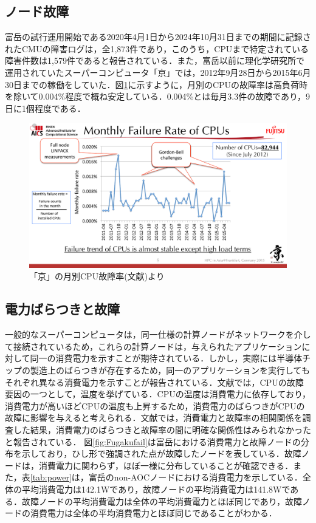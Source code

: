 \documentclass[a4paper,11pt,twocolumn]{jsarticle}
\begin{document}
\subsection{ノード故障}
富岳の試行運用開始である2020年4月1日から2024年10月31日までの期間に記録されたCMUの障害ログは，全1,873件であり，このうち，CPUまで特定されている障害件数は1,579件であると報告されている\cite{master_kusaba}．また，富岳以前に理化学研究所で運用されていたスーパーコンピュータ「京」では，2012年9月28日から2015年6月30日までの稼働をしていた．図\ref{fig:Kfail}に示すように，月別のCPUの故障率は高負荷時を除いて0.004\%程度で概ね安定している\cite{k_HPC}．0.004\%とは毎月3.3件の故障であり，9日に1個程度である．

\begin{figure}[t]
  \centering
  \includegraphics[width=0.8\linewidth]{figure/Kfail.pdf}
  \caption{「京」の月別CPU故障率(文献\cite{k_HPC})より}
  \label{fig:Kfail}
\end{figure}

\subsection{電力ばらつきと故障}
一般的なスーパーコンピュータは，同一仕様の計算ノードがネットワークを介して接続されているため，これらの計算ノードは，与えられたアプリケーションに対して同一の消費電力を示すことが期待されている．しかし，実際には半導体チップの製造上のばらつきが存在するため，同一のアプリケーションを実行してもそれぞれ異なる消費電力を示すことが報告されている．文献\cite{master_kusaba}では，CPUの故障要因の一つとして，温度を挙げている．CPUの温度は消費電力に依存しており，消費電力が高いほどCPUの温度も上昇するため，消費電力のばらつきがCPUの故障に影響を与えると考えられる．文献\cite{master_kusaba}では，消費電力と故障率の相関関係を調査した結果，消費電力のばらつきと故障率の間に明確な関係性はみられなかったと報告されている．
図\ref{fig:Fugakufail}は富岳における消費電力と故障ノードの分布を示しており，ひし形で強調された点が故障したノードを表している．故障ノードは，消費電力に関わらず，ほぼ一様に分布していることが確認できる．また，表\ref{tab:power}は，富岳のnon-AOCノードにおける消費電力を示している．全体の平均消費電力は142.1Wであり，故障ノードの平均消費電力は141.8Wである．故障ノードの平均消費電力は全体の平均消費電力とほぼ同じであり，故障ノードの消費電力は全体の平均消費電力とほぼ同じであることがわかる．
\end{document}
